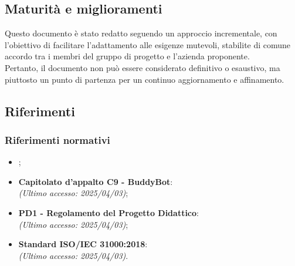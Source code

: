 \subsection{Maturità e miglioramenti}
Questo documento è stato redatto seguendo un approccio incrementale, 
con l'obiettivo di facilitare l'adattamento alle esigenze mutevoli, stabilite 
di comune accordo tra i membri del gruppo di progetto e l'azienda proponente.\\
Pertanto, il documento non può essere considerato definitivo o esaustivo, ma 
piuttosto un punto di partenza per un continuo aggiornamento e affinamento.

\subsection{Riferimenti}
\label{sec:riferimenti}

\subsubsection{Riferimenti normativi}
\begin{itemize}
    \item {}; \\
    \item \textbf{Capitolato d'appalto C9 - BuddyBot}: \\
    \emph{(Ultimo accesso: 2025/04/03)};\\
    \item \textbf{PD1 - Regolamento del Progetto Didattico}:\\
    \emph{(Ultimo accesso: 2025/04/03)};\\
    \item \textbf{Standard ISO/IEC 31000:2018}: \\
    \emph{(Ultimo accesso: 2025/04/03)}.\\
\end{itemize}

